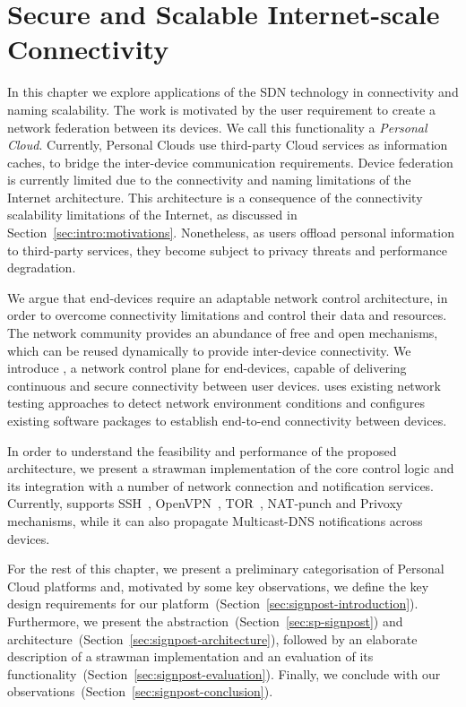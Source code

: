 \chapter{Secure and Scalable Internet-scale Connectivity}
\label{sec:signpost}

In this chapter we explore applications of the SDN technology in connectivity and
naming scalability.  The work is motivated by the user requirement to create a
network federation between its devices.  We call this functionality a
\emph{Personal Cloud}.  Currently, Personal Clouds use third-party Cloud
services as information caches, to bridge the inter-device communication
requirements. Device federation is currently limited due to the connectivity and
naming limitations of the Internet architecture.  This architecture is a
consequence of the connectivity scalability limitations of the Internet, as
discussed in Section~\ref{sec:intro:motivations}. Nonetheless, as users offload
personal information to third-party services, they become subject to privacy
threats and performance degradation.

We argue that end-devices require an adaptable network control architecture, in
order to overcome  connectivity limitations and control their data and
resources.  The network community provides an abundance of free and open
mechanisms, which can be reused dynamically to provide inter-device
connectivity.  We introduce \signpost, a network control plane for end-devices,
capable of delivering continuous and secure connectivity between user devices.
\signpost uses existing network testing approaches to detect network
environment conditions and configures existing software packages to establish
end-to-end connectivity between devices. 

In order to understand the feasibility and performance of the proposed
architecture, we present a strawman implementation of the core control logic and
its integration with a number of network connection and notification services.
Currently, \signpost supports SSH~, OpenVPN~,
TOR~, NAT-punch and Privoxy~ 
mechanisms, while it can also propagate Multicast-DNS notifications across
devices.

For the rest of this chapter, we present a preliminary categorisation of
Personal Cloud platforms and, motivated by some key observations, we define the
key design requirements for our
platform~(Section~\ref{sec:signpost-introduction}). Furthermore, we present the
\signpost abstraction~(Section~\ref{sec:sp-signpost}) and
architecture~(Section~\ref{sec:signpost-architecture}), followed by an elaborate
description of a strawman \signpost implementation and an evaluation of its
functionality~(Section~\ref{sec:signpost-evaluation}).  Finally, we conclude with our
observations~(Section~\ref{sec:signpost-conclusion}).

